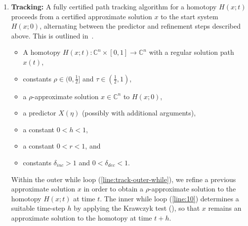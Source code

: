 \documentclass[11pt]{amsart}
\theoremstyle{definition}
\theoremstyle{remark}
\begin{document}
\begin{enumerate}
    \item \textbf{Tracking: } A fully certified path tracking algorithm for a homotopy $H(x;t)$ proceeds from a certified approximate solution $x$ to the start system $H(x;0)$,
    alternating between the predictor and refinement steps described above. This is outlined in~.


\begin{algorithm}[ht]
	\caption{CertifiedTrack}
 \label{algo:certified_curve_tracking}
\begin{algorithmic}[1]
\Require  
\begin{itemize}
    \item A homotopy $H(x;t):\mathbb{C}^{n}\times [0,1]\to \mathbb{C}^n$ with a regular solution path $x(t)$,
    \item constants $\rho\in(0,\frac{1}{2}]$ and $\tau\in(\frac{1}2,1)$,
    \item a $\rho$-approximate solution $x\in\mathbb{C}^n$ to $H(x;0)$,
    \item a predictor $X(\eta)$ (possibly with additional arguments),
    \item a constant $0<h<1$,
    \item a constant $0<r<1$, and
    \item constants $\delta_{inc}>1$ and $0<\delta_{dec}<1$.
\end{itemize}
 \label{line:track-outer-while}
\label{line:refine} 
\label{line:10}
\EndWhile
{}
\EndWhile
{}\label{line:6}
 \end{algorithmic}
 \end{algorithm}
 
Within the outer while loop (\ref{line:track-outer-while}), we refine a previous approximate solution $x$ in order to obtain a $\rho$-approximate solution to the homotopy $H(x;t)$ at time $t$. The inner while loop (\cref{line:10}) determines a suitable time-step $h$ by applying the Krawczyk test (), so that $x$ remains an approximate solution to the homotopy at time $t+h.$


\end{enumerate}
\end{document}
